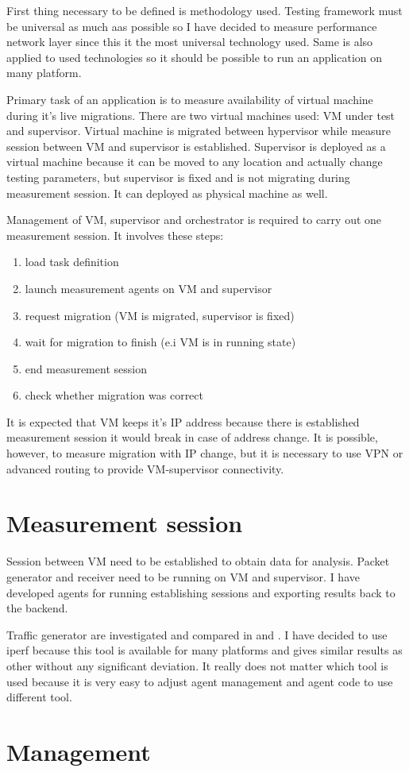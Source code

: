 
First thing necessary to be defined is methodology used. Testing framework must be universal as much aas possible so I have decided to measure performance network layer since this it the most universal technology used. Same is also applied to used technologies so it should be possible to run an application on many platform. 

Primary task of an application is to measure availability of virtual machine during it's live migrations. There are two virtual machines used: \Ac{VM} under test and supervisor. Virtual machine is migrated between hypervisor while measure session between \Ac{VM} and supervisor is established. Supervisor is deployed as a virtual machine because it can be moved to any location and actually change testing parameters, but supervisor is fixed and is not migrating during measurement session. It can deployed as physical machine as well.

Management of \Ac{VM}, supervisor and orchestrator is required to carry out one measurement session. It involves these steps:
\begin{enumerate}
	\item load task definition
	\item launch measurement agents on \Ac{VM} and supervisor
	\item request migration (\Ac{VM} is migrated, supervisor is fixed)
	\item wait for migration to finish (e.i \Ac{VM} is in running state)
	\item end measurement session
	\item check whether migration was correct
\end{enumerate}

It is expected that \Ac{VM} keeps it's \Ac{IP} address because there is established measurement session it would break in case of address change. It is possible, however, to measure migration with \Ac{IP} change, but it is necessary to use \Ac{VPN} or advanced routing to provide \Ac{VM}-supervisor connectivity.

\section{Measurement session}
Session between \Ac{VM} need to be established to obtain data for analysis. Packet generator and receiver need to be running on \Ac{VM} and supervisor. I have developed agents for running establishing sessions and exporting results back to the backend.

Traffic generator are investigated and compared in \cite{traffic-generators1} and \cite{traffic-generators2}. I have decided to use iperf because this tool is available for many platforms and gives similar results as other without any significant deviation. It really does not matter which tool is used because it is very easy to adjust agent management and agent code to use different tool.

\section{Management}
